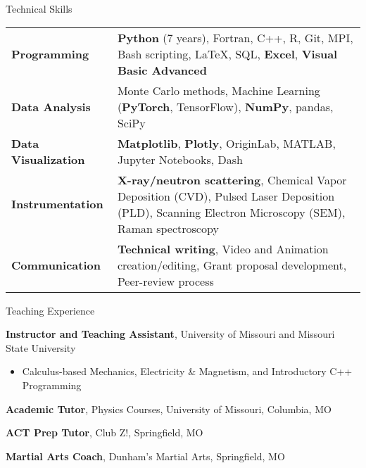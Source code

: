 
\begin{rubric}{Technical Skills}
    \begin{tabular}{@{}p{4.5cm} p{10.5cm}@{}}
        \textbf{Programming} & \textbf{Python} (7 years), Fortran, C++, R, Git, MPI, Bash scripting, LaTeX, SQL, \textbf{Excel},\textbf{ Visual Basic Advanced} \\
        \textbf{Data Analysis} & Monte Carlo methods, Machine Learning (\textbf{PyTorch}, TensorFlow), \textbf{NumPy}, pandas, SciPy \\
        \textbf{Data Visualization} & \textbf{Matplotlib}, \textbf{Plotly}, OriginLab, MATLAB, Jupyter Notebooks, Dash \\
        \textbf{Instrumentation} & \textbf{X-ray/neutron scattering}, Chemical Vapor Deposition (CVD), Pulsed Laser Deposition (PLD), Scanning Electron Microscopy (SEM), Raman spectroscopy \\
        \textbf{Communication} & \textbf{Technical writing}, Video and Animation creation/editing, Grant proposal development, Peer-review process 
    \end{tabular}
\end{rubric}


\nocite{*}

\printbibliography[heading=subbibliography,title={Journal Articles},type=article]

\printbibliography[heading=subbibliography,title={In Review / In Preparation},keyword=inprep]


\printbibliography[heading=subbibliography,title={Conference Proceedings},type=inproceedings]

\pagebreak
\begin{rubric}{Teaching Experience}

  \entry*[2018--2023]%
    \textbf{Instructor and Teaching Assistant}, University of Missouri and Missouri State University \RMPbadge\par
    \begin{itemize}
      \item Calculus-based Mechanics, Electricity \& Magnetism, and Introductory C++ Programming
    \end{itemize}

  \entry*[2021--Present]%
    \textbf{Academic Tutor}, Physics Courses, University of Missouri, Columbia, MO

  \entry*[2018--2021]%
    \textbf{ACT Prep Tutor}, Club Z!, Springfield, MO

  \entry*[2014--2020]%
    \textbf{Martial Arts Coach}, Dunham’s Martial Arts, Springfield, MO
\end{rubric}


